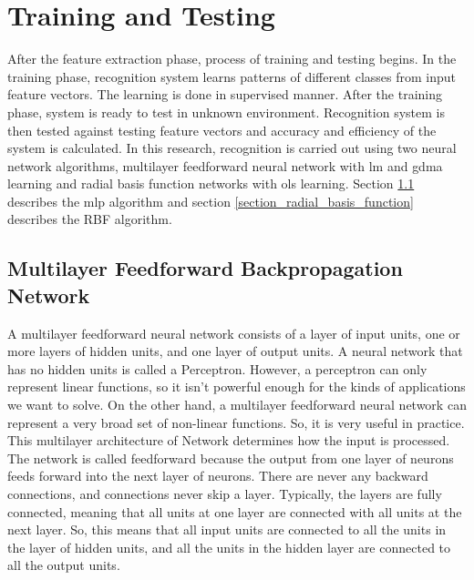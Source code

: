 
\section{Training and Testing}\label{section_training_testing_methodology}

After the feature extraction phase, process of training and testing begins. In the training phase, recognition system learns patterns of different classes from input feature vectors. The learning is done in supervised manner. After the training phase, system is ready to test in unknown environment. Recognition system is then tested against testing feature vectors and accuracy and efficiency of the system is calculated. In this research, recognition is carried out using two neural network algorithms, multilayer feedforward neural network with \ac{lm} and \ac{gdma} learning and radial basis function networks with \ac{ols} learning. Section \ref{section_multilayer_feedforward_network} describes the \ac{mlp} algorithm and section \ref{section_radial_basis_function} describes the RBF algorithm.

\subsection{Multilayer Feedforward Backpropagation Network}
\label{section_multilayer_feedforward_network}

A multilayer feedforward neural network consists of a layer of input units, one or more layers of hidden units, and one layer of output units. A neural network that has no hidden units is called a Perceptron. However, a perceptron can only represent linear functions, so it isn't powerful enough for the kinds of applications we want to solve. On the other hand, a multilayer feedforward neural network can represent a very broad set of non-linear functions. So, it is very useful in practice. This multilayer architecture of Network determines how the input is processed. The network is called feedforward because the output from one layer of neurons feeds forward into the next layer of neurons. There are never any backward connections, and connections never skip a layer. Typically, the layers are fully connected, meaning that all units at one layer are connected with all units at the next layer. So, this means that all input units are connected to all the units in the layer of hidden units, and all the units in the hidden layer are connected to all the output units.

